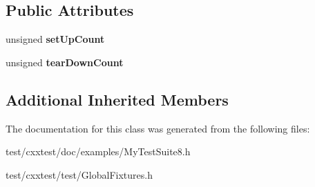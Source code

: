 \subsection*{Public Attributes}
\begin{DoxyCompactItemize}
\item 
\hypertarget{classFixture1_a96bbcbb9676f40f19d903615ec18ce2c}{unsigned {\bfseries set\-Up\-Count}}\label{classFixture1_a96bbcbb9676f40f19d903615ec18ce2c}

\item 
\hypertarget{classFixture1_a0df398d82b296ff27e787346d5e05830}{unsigned {\bfseries tear\-Down\-Count}}\label{classFixture1_a0df398d82b296ff27e787346d5e05830}

\end{DoxyCompactItemize}
\subsection*{Additional Inherited Members}


The documentation for this class was generated from the following files\-:\begin{DoxyCompactItemize}
\item 
test/cxxtest/doc/examples/My\-Test\-Suite8.\-h\item 
test/cxxtest/test/Global\-Fixtures.\-h\end{DoxyCompactItemize}
